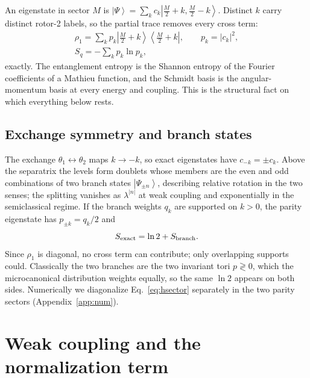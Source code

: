 \documentclass[pra,twocolumn,superscriptaddress,longbibliography,floatfix]{revtex4-2}
\newcommand{\ket}[1]{\left|#1\right\rangle}
\newcommand{\ketbra}[2]{\left|#1\right\rangle\!\left\langle#2\right|}
\begin{document}
An eigenstate in sector $M$ is
$\ket\Psi=\sum_{k}c_{k}\ket{\tfrac M2+k,\tfrac M2-k}$. Distinct $k$ carry
distinct rotor-2 labels, so the partial trace removes every cross term:
\begin{equation}
\begin{gathered}
\rho_{1}=\sum_{k}p_{k}\ketbra{\tfrac M2+k}{\tfrac M2+k},\qquad p_{k}=|c_{k}|^{2},\\
S_{q}=-\sum_{k}p_{k}\ln p_{k},
\end{gathered}
\label{eq:Smathieu}
\end{equation}
exactly. The entanglement entropy is the Shannon entropy of the Fourier
coefficients of a Mathieu function, and the Schmidt basis is the
angular-momentum basis at every energy and coupling. This is the structural fact
on which everything below rests.

\subsection{Exchange symmetry and branch states}
\label{sec:ln2}

The exchange $\theta_{1}\leftrightarrow\theta_{2}$ maps $k\to-k$, so exact
eigenstates have $c_{-k}=\pm c_{k}$. Above the separatrix the levels form
doublets whose members are the even and odd combinations of two branch states
$\ket{\Psi_{\pm n}}$, describing relative rotation in the two senses; the
splitting vanishes as $\lambda^{|n|}$ at weak coupling and exponentially in the
semiclassical regime. If the branch weights $q_{k}$ are supported on $k>0$, the
parity eigenstate has $p_{\pm k}=q_{k}/2$ and
\begin{equation}
S_{\rm exact}=\ln2+S_{\rm branch}.
\label{eq:Sln2}
\end{equation}
Since $\rho_{1}$ is diagonal, no cross term can contribute; only overlapping
supports could. Classically the two branches are the two invariant tori
$p\gtrless0$, which the microcanonical distribution weights equally, so the same
$\ln2$ appears on both sides. Numerically we diagonalize Eq.~\eqref{eq:hsector}
separately in the two parity sectors (Appendix~\ref{app:num}).

\section{Weak coupling and the normalization term}
\label{sec:weak}
\end{document}
